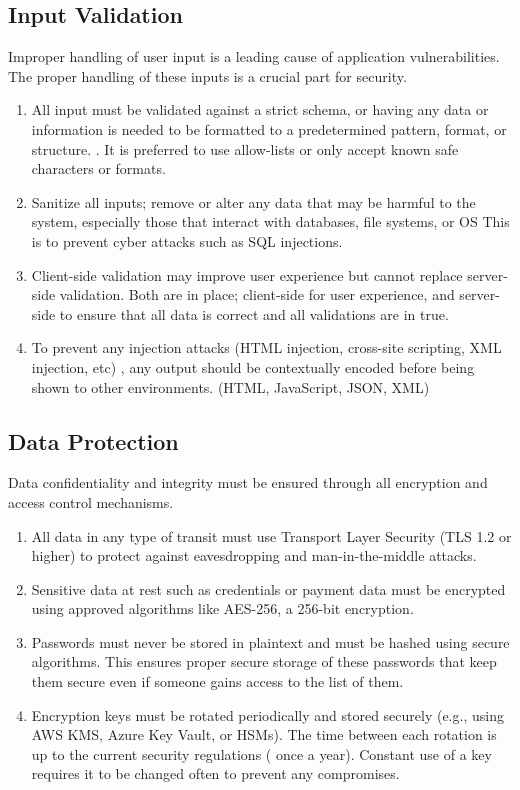 \subsection{Input Validation}
Improper handling of user input is a leading cause of application vulnerabilities. The proper handling of these inputs is a crucial part for security.
\begin{enumerate}
    \item All input must be validated against a strict schema, or having any data or information is needed to be formatted to a predetermined pattern, format, or structure. . It is preferred to use allow-lists or only accept known safe characters or formats. 
    \item Sanitize all inputs; remove or alter any data that may be harmful to the system, especially those that interact with databases, file systems, or OS This is to prevent cyber attacks such as SQL injections.
    \item Client-side validation may improve user experience but cannot replace server-side validation. Both are in place; client-side for user experience, and server-side to ensure that all data is correct and all validations are in true.
    \item To prevent any injection attacks (HTML injection, cross-site scripting, XML injection, etc) , any output should be contextually encoded before being shown to other environments.  (HTML, JavaScript, JSON, XML)

\end{enumerate}

\subsection{Data Protection}
Data confidentiality and integrity must be ensured through all encryption and access control mechanisms.
\begin{enumerate}
    \item All data in any type of transit must use Transport Layer Security (TLS 1.2 or higher) to protect against eavesdropping and man-in-the-middle attacks.
    \item Sensitive data at rest such as credentials or payment data must be encrypted using approved algorithms like AES-256, a 256-bit encryption.
    \item Passwords must never be stored in plaintext and must be hashed using secure algorithms. This ensures proper secure storage of these passwords that keep them secure even if someone gains access to the list of them.
    \item Encryption keys must be rotated periodically and stored securely (e.g., using AWS KMS, Azure Key Vault, or HSMs). The time between each rotation is up to the current security regulations ( once a year). Constant use of a key requires it to be changed often to prevent any compromises.
\end{enumerate}


